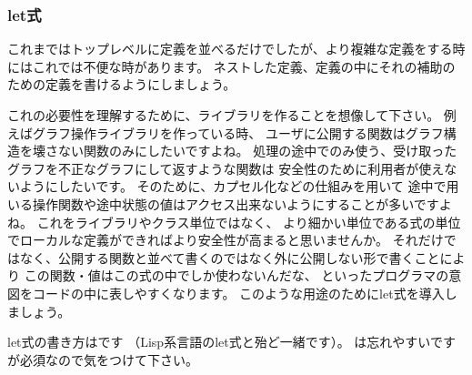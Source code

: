 \documentclass[11pt,a4paper]{jarticle}
\begin{document}





\subsubsection{let式}
これまではトップレベルに定義を並べるだけでしたが、より複雑な定義をする時にはこれでは不便な時があります。
ネストした定義、定義の中にそれの補助のための定義を書けるようにしましょう。

これの必要性を理解するために、ライブラリを作ることを想像して下さい。
例えばグラフ操作ライブラリを作っている時、
ユーザに公開する関数はグラフ構造を壊さない関数のみにしたいですよね。
処理の途中でのみ使う、受け取ったグラフを不正なグラフにして返すような関数は
安全性のために利用者が使えないようにしたいです。
そのために、カプセル化などの仕組みを用いて
途中で用いる操作関数や途中状態の値はアクセス出来ないようにすることが多いですよね。
これをライブラリやクラス単位ではなく、
より細かい単位である式の単位でローカルな定義ができればより安全性が高まると思いませんか。
それだけではなく、公開する関数と並べて書くのではなく外に公開しない形で書くことにより
この関数・値はこの式の中でしか使わないんだな、
といったプログラマの意図をコードの中に表しやすくなります。
このような用途のためにlet式を導入しましょう。

let式の書き方はです
（Lisp系言語のlet式と殆ど一緒です）。
は忘れやすいですが必須なので気をつけて下さい。
\end{document}
